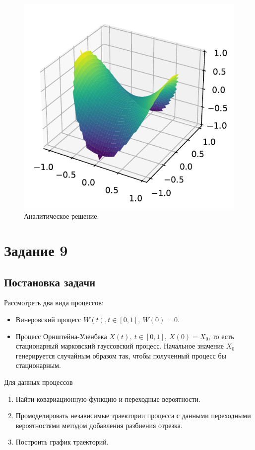 \documentclass[16pt]{article}
\begin{document}
\begin{figure}[h]
	\center
	\includegraphics[scale=0.9]{8_2.pdf}
	\caption{Аналитическое решение.}
\end{figure}

\section{Задание 9}
\subsection{Постановка задачи}
Рассмотреть два вида процессов:
\begin{itemize}
	\item Винеровский процесс $W(t), t \in [0, 1], \ W(0) = 0.$
	\item Процесс Орнштейна-Уленбека $X(t),\ t \in [0, 1], \ X(0) = X_0$, то есть стационарный марковский гауссовский процесс. Начальное значение $X_0$ генерируется случайным образом так, чтобы полученный процесс бы стационарным.
\end{itemize}

Для данных процессов
\begin{enumerate}
	\item Найти ковариационную функцию и переходные вероятности.
	\item Промоделировать независимые траектории процесса с данными переходными вероятностями методом добавления разбиения отрезка.
	\item Построить график траекторий.
\end{enumerate}
\end{document}
